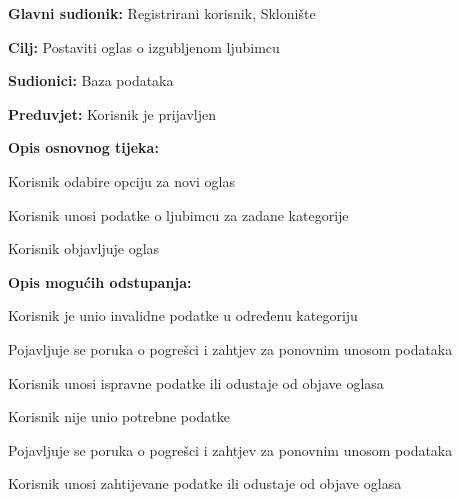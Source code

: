 					\noindent {}
					\begin{packed_item}
						
						\item \textbf{Glavni sudionik: }Registrirani korisnik, Sklonište 
						\item  \textbf{Cilj:} Postaviti oglas o izgubljenom ljubimcu
						\item  \textbf{Sudionici:} Baza podataka
						\item  \textbf{Preduvjet:} Korisnik je prijavljen
						\item  \textbf{Opis osnovnog tijeka:}
						
						\item[] \begin{packed_enum}
							
							\item Korisnik odabire opciju za novi oglas
							\item Korisnik unosi podatke o ljubimcu za zadane kategorije
							\item Korisnik objavljuje oglas
						\end{packed_enum}
						
						\item  \textbf{Opis mogućih odstupanja:}
						
						\item[] \begin{packed_item}
							
							\item[2.a] Korisnik je unio invalidne podatke u određenu kategoriju
							\item[] \begin{packed_enum}
								
								\item Pojavljuje se poruka o pogrešci i zahtjev za ponovnim unosom podataka
								\item Korisnik unosi ispravne podatke ili odustaje od objave oglasa
								
							\end{packed_enum}
							\item[2.b] Korisnik nije unio potrebne podatke
							\item[] \begin{packed_enum}
								
								\item Pojavljuje se poruka o pogrešci i zahtjev za ponovnim unosom podataka
								\item Korisnik unosi zahtijevane podatke ili odustaje od objave oglasa
								
							\end{packed_enum}
						\end{packed_item}
					\end{packed_item}
